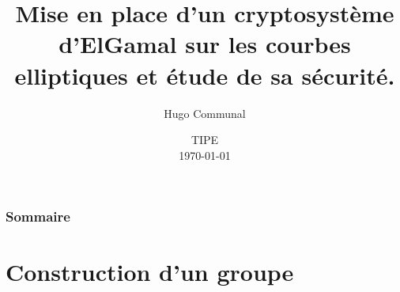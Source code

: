 \documentclass[
	11pt, %
]{beamer}
\title[Short Title]{Mise en place d'un cryptosystème d'ElGamal sur les courbes elliptiques et étude de sa sécurité.} %
\author[Hugo Communal]{Hugo Communal} %
\date[\today]{TIPE \\ \today} %
\begin{document}

\begin{frame}
	\titlepage %
\end{frame}



\begin{frame}
	\frametitle{Sommaire} %
	
	\tableofcontents %
\end{frame}


\section{Construction d'un groupe} %
\end{document}
